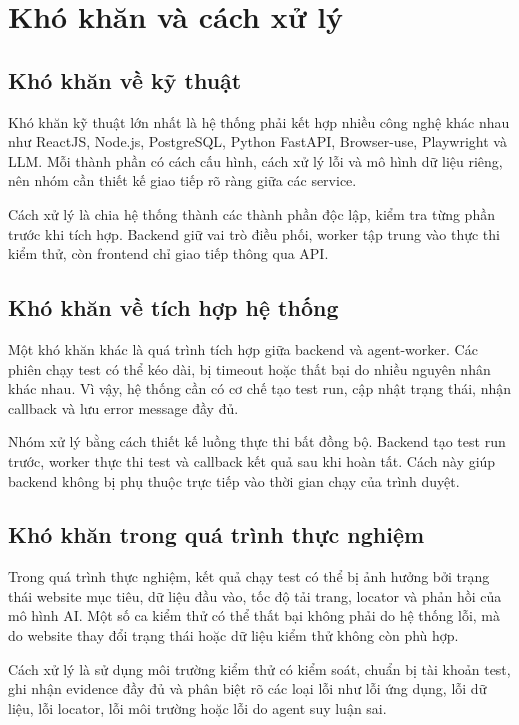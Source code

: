 \section{Khó khăn và cách xử lý}

\subsection{Khó khăn về kỹ thuật}

Khó khăn kỹ thuật lớn nhất là hệ thống phải kết hợp nhiều công nghệ khác nhau như ReactJS, Node.js, PostgreSQL, Python FastAPI, Browser-use, Playwright và LLM. Mỗi thành phần có cách cấu hình, cách xử lý lỗi và mô hình dữ liệu riêng, nên nhóm cần thiết kế giao tiếp rõ ràng giữa các service.

Cách xử lý là chia hệ thống thành các thành phần độc lập, kiểm tra từng phần trước khi tích hợp. Backend giữ vai trò điều phối, worker tập trung vào thực thi kiểm thử, còn frontend chỉ giao tiếp thông qua API.

\subsection{Khó khăn về tích hợp hệ thống}

Một khó khăn khác là quá trình tích hợp giữa backend và agent-worker. Các phiên chạy test có thể kéo dài, bị timeout hoặc thất bại do nhiều nguyên nhân khác nhau. Vì vậy, hệ thống cần có cơ chế tạo test run, cập nhật trạng thái, nhận callback và lưu error message đầy đủ.

Nhóm xử lý bằng cách thiết kế luồng thực thi bất đồng bộ. Backend tạo test run trước, worker thực thi test và callback kết quả sau khi hoàn tất. Cách này giúp backend không bị phụ thuộc trực tiếp vào thời gian chạy của trình duyệt.

\subsection{Khó khăn trong quá trình thực nghiệm}

Trong quá trình thực nghiệm, kết quả chạy test có thể bị ảnh hưởng bởi trạng thái website mục tiêu, dữ liệu đầu vào, tốc độ tải trang, locator và phản hồi của mô hình AI. Một số ca kiểm thử có thể thất bại không phải do hệ thống lỗi, mà do website thay đổi trạng thái hoặc dữ liệu kiểm thử không còn phù hợp.

Cách xử lý là sử dụng môi trường kiểm thử có kiểm soát, chuẩn bị tài khoản test, ghi nhận evidence đầy đủ và phân biệt rõ các loại lỗi như lỗi ứng dụng, lỗi dữ liệu, lỗi locator, lỗi môi trường hoặc lỗi do agent suy luận sai.


